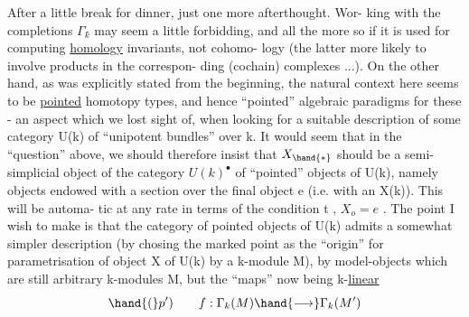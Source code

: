 After a little break for dinner, just one more afterthought. Wor-%
king with the completions $\Gamma_k\hat{}$ may seem a little forbidding, and all
the more so if it is used for computing \uline{homology} invariants, not cohomo-%
logy (the latter more likely to involve  products in  the correspon-%
ding (cochain) complexes ...). On the other hand, as was explicitly
stated from the beginning, the natural context here seems to be
\uline{pointed} homotopy types, and hence ``pointed'' algebraic paradigms for
these - an aspect which we lost sight of, when looking for a suitable
description of some category U(k) of ``unipotent bundles'' over k. It
would seem that in the ``question'' above, we should therefore insist
that $X_{\hand{\ast}}$ should be a semi-simplicial object of the category $U(k)^{\bullet}$ of
``pointed'' objects of U(k), namely objects  endowed with a section over
the final object e (i.e. with an   X(k)). This will be automa-%
tic at any rate in terms of the condition \hand{(}t\hand{)} , $X_o = e$ . The point I
wish to make is that the category of pointed objects of U(k) admits a
somewhat simpler description (by chosing the marked point as the ``origin''
for  parametrisation of   object X of U(k) by a k-module M),
by model-objects which are still arbitrary k-modules M, but the ``maps''
now being k-\uline{linear}  
\[ \hand{(}p') \qquad f : \Gamma_k(M) \hand{\longrightarrow} \Gamma_k(M') \]

